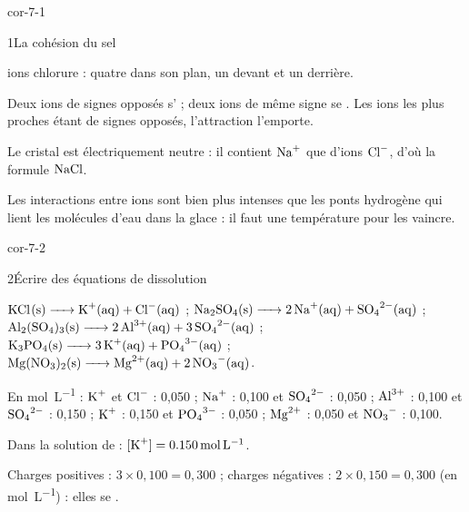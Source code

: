 \corrigesSouples

\begin{blocLivre}{cor-7-1}
\begin{corrige}{1}{La cohésion du sel}
\begin{questions}
\item {} ions chlorure : quatre dans son plan, un devant et un derrière.
\item Deux ions de signes opposés s' ; deux ions de même signe se . Les ions les plus proches
étant de signes opposés, l'attraction l'emporte.
\item Le cristal est électriquement neutre : il contient  $\ce{Na+}$ que d'ions $\ce{Cl-}$, d'où la formule $\ce{NaCl}$.
\item Les interactions entre ions sont bien plus intenses que les ponts hydrogène qui lient les molécules d'eau dans la
glace : il faut une température  pour les vaincre.
\end{questions}
\end{corrige}
\end{blocLivre}
\begin{blocLivre}{cor-7-2}
\begin{corrige}{2}{Écrire des équations de dissolution}
\begin{questions}
\item $\ce{KCl(s) -> K+(aq) + Cl^{-}(aq)}$ ; $\ce{Na2SO4(s) -> 2Na+(aq) + SO4^{2-}(aq)}$ ; $\ce{Al2(SO4)3(s) -> 2Al^{3+}(aq) + 3SO4^{2-}(aq)}$ ;
$\ce{K3PO4(s) -> 3K+(aq) + PO4^{3-}(aq)}$ ; $\ce{Mg(NO3)2(s) -> Mg^{2+}(aq) + 2NO3^{-}(aq)}$.
\item En \unit{mol.L^{-1}} : $\ce{K+}$ et $\ce{Cl-}$ : 0,050 ; $\ce{Na+}$ : 0,100 et $\ce{SO4^{2-}}$ : 0,050 ; $\ce{Al^{3+}}$ : 0,100 et $\ce{SO4^{2-}}$ : 0,150 ;
$\ce{K+}$ : 0,150 et $\ce{PO4^{3-}}$ : 0,050 ; $\ce{Mg^{2+}}$ : 0,050 et $\ce{NO3-}$ : 0,100.
\item Dans la solution de  : $[\ce{K+}]=\qty{0,150}{mol.L^{-1}}$.
\item Charges positives : $3\times0{,}100=0{,}300$ ; charges négatives : $2\times0{,}150=0{,}300$ (en \unit{mol.L^{-1}}) : elles se .
\end{questions}
\end{corrige}
\end{blocLivre}
